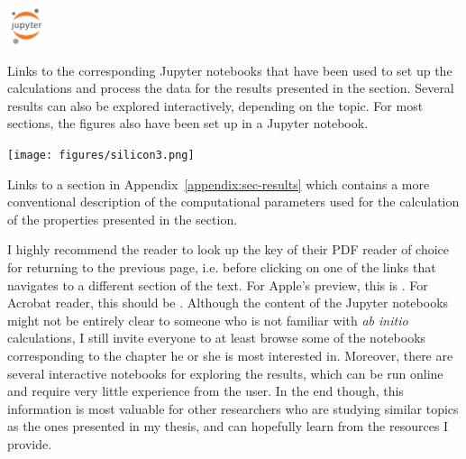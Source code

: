 \begin{refsection}
\vspace{1em}
\begin{minipage}{0.09\textwidth}
\includegraphics[width=3em]{figures/jupyter.png}
\end{minipage}
\begin{minipage}{0.9\textwidth}
Links to the corresponding Jupyter notebooks that have been used to set up the calculations and process the data for the results presented in the section. Several results can also be explored interactively, depending on the topic. For most sections, the figures also have been set up in a Jupyter notebook.
\end{minipage}

\vspace{1em}
\begin{minipage}{0.09\textwidth}
\texttt{[image: figures/silicon3.png]}
\end{minipage}
\begin{minipage}{0.9\textwidth}
Links to a section in Appendix~\ref{appendix:sec-results} which contains a more conventional description of the computational parameters used for the calculation of the properties presented in the section.
\end{minipage}

\vspace{1em}
I highly recommend the reader to look up the key of their PDF reader of choice for returning to the previous page, i.e. before clicking on one of the links that navigates to a different section of the text. For Apple's preview, this is \code{Cmd+[}. For Acrobat reader, this should be . Although the content of the Jupyter notebooks might not be entirely clear to someone who is not familiar with \textit{ab initio} calculations, I still invite everyone to at least browse some of the notebooks corresponding to the chapter he or she is most interested in. Moreover, there are several interactive notebooks for exploring the results, which can be run online and require very little experience from the user. In the end though, this information is most valuable for other researchers who are studying similar topics as the ones presented in my thesis, and can hopefully learn from the resources I provide.


\printbibliography 
\end{refsection} 

